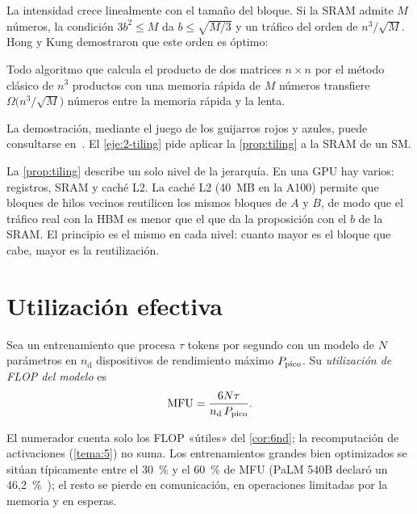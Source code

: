 La intensidad crece linealmente con el tamaño del bloque. Si la SRAM admite $M$ números, la condición $3b^{2}\le M$ da $b\le\sqrt{M/3}$ y un tráfico del orden de $n^{3}/\sqrt{M}$. Hong y Kung demostraron que este orden es óptimo:

\begin{teorema}\label{teo:hongkung}
Todo algoritmo que calcula el producto de dos matrices $n\times n$ por el método clásico de $n^{3}$ productos con una memoria rápida de $M$ números transfiere $\Omega\bigl(n^{3}/\sqrt{M}\bigr)$ números entre la memoria rápida y la lenta.
\end{teorema}

La demostración, mediante el juego de los guijarros rojos y azules, puede consultarse en~\cite{hongkung}. El \cref{eje:2-tiling} pide aplicar la \cref{prop:tiling} a la SRAM de un SM.

\begin{observacion}
La \cref{prop:tiling} describe un solo nivel de la jerarquía. En una GPU hay varios: registros, SRAM y caché L2. La caché L2 (40~MB en la A100) permite que bloques de hilos vecinos reutilicen los mismos bloques de $A$ y $B$, de modo que el tráfico real con la HBM es menor que el que da la proposición con el $b$ de la SRAM. El principio es el mismo en cada nivel: cuanto mayor es el bloque que cabe, mayor es la reutilización.
\end{observacion}

\section{Utilización efectiva}

\begin{definicion}\label{def:mfu}
Sea un entrenamiento que procesa $\tau$ tokens por segundo con un modelo de $N$ parámetros en $n_{\mathrm{d}}$ dispositivos de rendimiento máximo $P_{\mathrm{pico}}$. Su \emph{utilización de FLOP del modelo} es~\cite[§4.1 y apéndice~B]{palm}
\[
\mathrm{MFU}=\frac{6N\tau}{n_{\mathrm{d}}\,P_{\mathrm{pico}}}.
\]
\end{definicion}

El numerador cuenta solo los FLOP «útiles» del \cref{cor:6nd}; la recomputación de activaciones (\cref{tema:5}) no suma. Los entrenamientos grandes bien optimizados se sitúan típicamente entre el 30~\% y el 60~\% de MFU (PaLM 540B declaró un 46{,}2~\%~\cite[§4.1]{palm}); el resto se pierde en comunicación, en operaciones limitadas por la memoria y en esperas.

